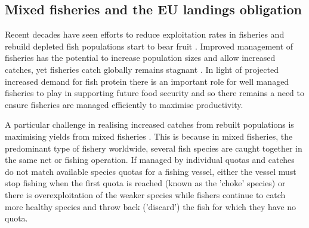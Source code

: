 \documentclass{nature}
\begin{document}
\begin{linenumbers}
\section*{}

\subsection{Mixed fisheries and the EU landings obligation} 

Recent decades have seen efforts to reduce exploitation rates in fisheries and
rebuild depleted fish populations start to bear fruit \cite{Worm2009}.
Improved management of fisheries has the potential to increase population sizes
and allow increased catches, yet fisheries catch globally remains stagnant
\cite{FAO2016}.  In light of projected increased demand for fish protein
\cite{B??n??2016} there is an important role for well managed fisheries to play
in supporting future food security \cite{Mcclanahan2015} and so there remains a
need to ensure fisheries are managed efficiently to maximise productivity.

A particular challenge in realising increased catches from rebuilt populations
is maximising yields from mixed fisheries \cite{Branch2008, Kuriyama2016,
	Ulrich2016}. This is because in mixed fisheries, the predominant type
of fishery worldwide, several fish species are caught together in the same net
or fishing operation. If managed by individual quotas and catches do not match
available species quotas for a fishing vessel, either the vessel must stop
fishing when the first quota is reached (known as the 'choke' species) or there
is overexploitation of the weaker species while fishers continue to catch more
healthy species and throw back ('discard') the fish for which they have no
quota.


\end{linenumbers}
\end{document}
